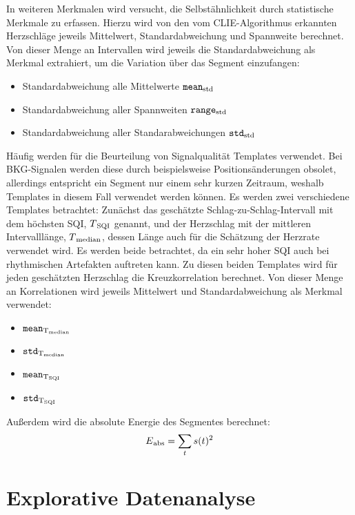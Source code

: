 In weiteren Merkmalen wird versucht, die Selbstähnlichkeit durch statistische Merkmale zu erfassen. Hierzu wird von den vom \ac{CLIE}-Algorithmus erkannten Herzschläge jeweils Mittelwert, Standardabweichung und Spannweite berechnet. Von dieser Menge an Intervallen wird jeweils die Standardabweichung als Merkmal extrahiert, um die Variation über das Segment einzufangen:
\begin{itemize}
	\item Standardabweichung alle Mittelwerte $\texttt{mean}\textsubscript{std}$
	\item Standardabweichung aller Spannweiten $\texttt{range}\textsubscript{std}$
	\item Standardabweichung aller Standarabweichungen $\texttt{std}\textsubscript{std}$
\end{itemize}

Häufig werden für die Beurteilung von Signalqualität Templates verwendet. Bei \ac{BKG}-Signalen werden diese durch beispielsweise Positionsänderungen obsolet, allerdings entspricht ein Segment nur einem sehr kurzen Zeitraum, weshalb Templates in diesem Fall verwendet werden können. Es werden zwei verschiedene Templates betrachtet: Zunächst das geschätzte Schlag-zu-Schlag-Intervall mit dem höchsten \ac{SQI}, $T\textsubscript{SQI}$ genannt, und der Herzschlag mit der mittleren Intervalllänge, $T\textsubscript{median}$, dessen Länge auch für die Schätzung der Herzrate verwendet wird. Es werden beide betrachtet, da ein sehr hoher \ac{SQI} auch bei rhythmischen Artefakten auftreten kann. Zu diesen beiden Templates wird für jeden geschätzten Herzschlag die Kreuzkorrelation berechnet. Von dieser Menge an Korrelationen wird jeweils Mittelwert und Standardabweichung als Merkmal verwendet:
\begin{itemize}
	\item $\texttt{mean}\textsubscript{T\textsubscript{median}}$
	\item $\texttt{std}\textsubscript{T\textsubscript{median}}$
	\item $\texttt{mean}\textsubscript{T\textsubscript{SQI}}$
	\item $\texttt{std}\textsubscript{T\textsubscript{SQI}}$
\end{itemize}

Außerdem wird die absolute Energie des Segmentes berechnet:
\[
	E\textsubscript{abs} = \sum_t s(t)^2
\]

\section{Explorative Datenanalyse}

